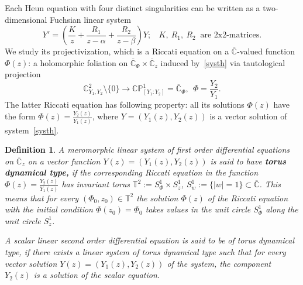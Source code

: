 \documentclass[preprint,12pt]{elsarticle}
\theoremstyle{plain}
\newtheorem{definition}[theorem]{Definition}
\numberwithin{equation}{section}
\numberwithin{equation}{section}
\begin{document}
Each Heun equation with four distinct singularities can be written as a two-dimensional Fuchsian linear system
\begin{equation}Y'=\left(\frac Kz+\frac{R_1}{z-\alpha}+\frac{R_2}{z-\beta}\right)Y; \ \ 
\ \ K, \ R_1, \ R_2 \ \text{ are 2x2-matrices.}\label{systh}\end{equation}
We study its projectivization, which is a Riccati equation on a $\overline{\mathbb{C}}$-valued function $\Phi(z)$: a holomorphic 
foliation on $\overline{\mathbb{C}}_{\Phi}\times\overline{\mathbb{C}}_z$ induced by~\eqref{systh} via tautological projection 
$$\mathbb{C}^2_{Y_1,Y_2}\setminus\{0\}\to\mathbb{CP}^1_{[Y_1:Y_2]}=\overline{\mathbb{C}}_{\Phi}, \ \ \Phi=\frac{Y_2}{Y_1}.$$  
The latter Riccati equation has following property: all its solutions $\Phi(z)$ have the form $\Phi(z)=\frac{Y_2(z)}{Y_1(z)}$, where $Y=(Y_1(z), Y_2(z))$ is a vector solution of system~\eqref{systh}. 

\begin{definition} 

A meromorphic linear system of first order differential equations on $\overline{\mathbb{C}}_z$ on a vector function $Y(z)=(Y_1(z),Y_2(z))$  is said to have {\bf torus dynamical type,} if the corresponding Riccati equation in the function $\Phi(z)=\frac{Y_2(z)}{Y_1(z)}$  has invariant torus $\mathbb{T}^2:=S^1_\Phi\times S^1_z$, $S^1_w:=\{|w|=1\}\subset\overline{\mathbb{C}}$. This means that for every $(\Phi_0,z_0)\in\mathbb{T}^2$ the solution $\Phi(z)$ of the Riccati equation with the initial condition $\Phi(z_0)=\Phi_0$ takes values in the unit circle $S_\Phi^1$ along the unit circle $S_z^1$. 

A \emph{scalar linear second order differential equation} is said to be of {\it torus dynamical type}, if there exists a linear system of torus dynamical type such  that for every vector solution $Y(z)=(Y_1(z),Y_2(z))$ of the system, the component $Y_2(z)$ is a solution of the scalar equation.

\end{definition}
\end{document}
